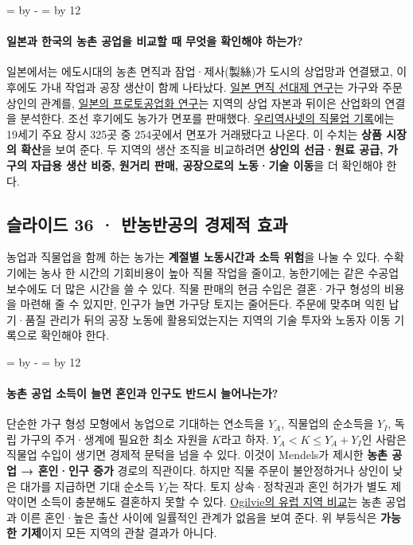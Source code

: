 \documentclass[10pt,a4paper]{article}
\newcommand{\ReserveQuestionSpace}{%
  \par\begingroup
  \dimen0=\pagegoal \advance\dimen0 by -\pagetotal
  \dimen2=\baselineskip \multiply\dimen2 by 12
  \ifdim\dimen0<\dimen2 \newpage\fi
  \endgroup}
\begin{document}
\ReserveQuestionSpace
\paragraph{일본과 한국의 농촌 공업을 비교할 때 무엇을 확인해야 하는가?}

일본에서는 에도시대의 농촌 면직과 잠업·제사(製絲)가 도시의 상업망과 연결됐고, 이후에도 가내 작업과 공장 생산이 함께 나타났다. \href{https://academic.oup.com/book/52242/chapter-abstract/421084316}{일본 면직 선대제 연구}는 가구와 주문 상인의 관계를, \href{https://dhowell.scholars.harvard.edu/publications/proto-industrial-origins-japanese-capitalism}{일본의 프로토공업화 연구}는 지역의 상업 자본과 뒤이은 산업화의 연결을 분석한다. 조선 후기에도 농가가 면포를 판매했다. \href{https://contents.history.go.kr/front/km/print.do?levelId=km\_016\_0040\_0010\_0040\&whereStr=}{우리역사넷의 직물업 기록}에는 19세기 주요 장시 325곳 중 254곳에서 면포가 거래됐다고 나온다. 이 수치는 \textbf{상품 시장의 확산}을 보여 준다. 두 지역의 생산 조직을 비교하려면 \textbf{상인의 선금·원료 공급, 가구의 자급용 생산 비중, 원거리 판매, 공장으로의 노동·기술 이동}을 더 확인해야 한다.\par

\subsection{슬라이드 36 · 반농반공의 경제적 효과}
농업과 직물업을 함께 하는 농가는 \textbf{계절별 노동시간과 소득 위험}을 나눌 수 있다. 수확기에는 농사 한 시간의 기회비용이 높아 직물 작업을 줄이고, 농한기에는 같은 수공업 보수에도 더 많은 시간을 쓸 수 있다. 직물 판매의 현금 수입은 결혼·가구 형성의 비용을 마련해 줄 수 있지만, 인구가 늘면 가구당 토지는 줄어든다. 주문에 맞추며 익힌 납기·품질 관리가 뒤의 공장 노동에 활용되었는지는 지역의 기술 투자와 노동자 이동 기록으로 확인해야 한다.\par

\ReserveQuestionSpace
\paragraph{농촌 공업 소득이 늘면 혼인과 인구도 반드시 늘어나는가?}
단순한 가구 형성 모형에서 농업으로 기대하는 연소득을 $Y_A$, 직물업의 순소득을 $Y_I$, 독립 가구의 주거·생계에 필요한 최소 자원을 $K$라고 하자. $Y_A<K\leq Y_A+Y_I$인 사람은 직물업 수입이 생기면 경제적 문턱을 넘을 수 있다. 이것이 Mendels가 제시한 \textbf{농촌 공업 → 혼인·인구 증가} 경로의 직관이다. 하지만 직물 주문이 불안정하거나 상인이 낮은 대가를 지급하면 기대 순소득 $Y_I$는 작다. 토지 상속·정착권과 혼인 허가가 별도 제약이면 소득이 충분해도 결혼하지 못할 수 있다. \href{https://sheilaghogilvie.com/wp-content/uploads/publications/Ogilvie-1993-Proto-industrialization.pdf}{Ogilvie의 유럽 지역 비교}는 농촌 공업과 이른 혼인·높은 출산 사이에 일률적인 관계가 없음을 보여 준다. 위 부등식은 \textbf{가능한 기제}이지 모든 지역의 관찰 결과가 아니다.\par
\end{document}
